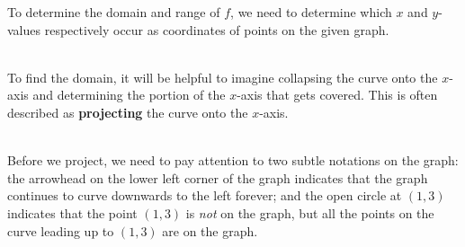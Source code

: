 \documentclass[12pt]{article}
\theoremstyle{definition}
\begin{document}
To determine the domain and range of $f$, we need to determine which $x$ and $y$-values respectively occur as coordinates of points on the given graph.\\
\ \par
To find the domain, it will be helpful to imagine collapsing the curve onto the $x$-axis and determining the portion of the $x$-axis that gets covered.  This is often described as {\bf projecting} the curve onto the $x$-axis.\\
\ \par
Before we project, we need to pay attention to two subtle notations on the graph:  the arrowhead on the lower left corner of the graph indicates that the graph continues to curve downwards to the left forever; and the open circle at $(1,3)$ indicates that the point $(1,3)$ is {\it not} on the graph, but all the points on the curve leading up to $(1,3)$ are on the graph.
\end{document}
